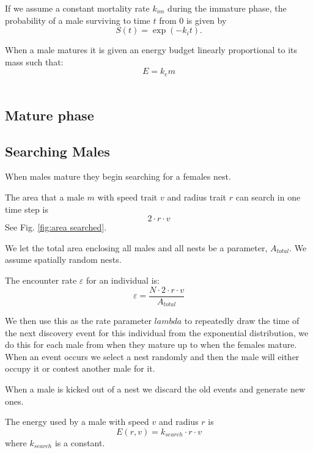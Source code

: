 \documentclass[a4paper,11pt]{article}
\begin{document}
If we assume a constant mortality rate $k_{im}$ during the immature phase, the probability of a male surviving to time $t$ from $0$ is given by
\begin{equation} \label{eq:surv_immature}
    S(t) = \exp(-k_i t).
\end{equation}

When a male matures it is given an energy budget linearly proportional to its mass such that: 
$$ E = k_em$$\\

\subsection{Mature phase}
\subsection{Searching Males}
When males mature they begin searching for a females nest.

The area that a male $m$ with speed trait $v$ and radius trait $r$ can search in one time step is
\begin{equation}
    2 \cdot r \cdot v
\end{equation}
See Fig. \ref{fig:area searched}.

We let the total area enclosing all males and all nests be a parameter, $A_{total}$. We assume spatially random nests.

The encounter rate $\varepsilon$ for an individual is:
\begin{equation} \label{eq:encounter rate}
    \varepsilon = \frac {N \cdot 2 \cdot r \cdot v} {A_{total}}
\end{equation}
\citep{Gurarie2012}

We then use this as the rate parameter $lambda$ to repeatedly draw the time of the next discovery event for this individual from the exponential distribution, we do this for each male from when they mature up to when the females mature.
When an event occurs we select a nest randomly and then the male will either occupy it or contest another male for it.

When a male is kicked out of a nest we discard the old events and generate new ones.

The energy used by a male with speed $v$ and radius $r$ is 
\begin{equation}
    E(r,v) = k_{search} \cdot r \cdot v
\end{equation}
where $k_{search}$ is a constant.
\end{document}
